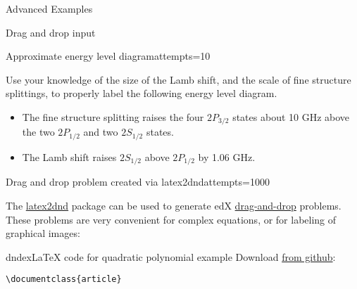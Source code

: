 
\begin{edXchapter}{Advanced Examples}

\begin{edXsection}{Drag and drop input}

\begin{edXvertical}

\begin{edXproblem}{Approximate energy level diagram}{attempts=10}

Use your knowledge of the size of the Lamb shift, and the scale of fine
structure splittings, to properly label the following energy level diagram.


\begin{edXsolution}

\begin{itemize}

\item The fine structure splitting raises the four $2P_{3/2}$ states about
10 GHz above the two $2P_{1/2}$ and two $2S_{1/2}$ states.

\item The Lamb shift raises $2S_{1/2}$ above $2P_{1/2}$ by 1.06 GHz.

\end{itemize}

\end{edXsolution}

\end{edXproblem}


\end{edXvertical}


\begin{edXvertical}

\begin{edXproblem}{Drag and drop problem created via latex2dnd}{attempts=1000}

The \href{https://github.com/mitocw/latex2dnd}{latex2dnd} package can
be used to generate edX
\href{http://edx.readthedocs.org/projects/devdata/en/latest/course_data_formats/drag_and_drop/drag_and_drop_input.html}{drag-and-drop}
problems.  These problems are very convenient for complex equations,
or for labeling of graphical images:

\begin{edXshowhide}{dndex}{LaTeX code for quadratic polynomial example}
Download \href{https://github.com/mitocw/latex2dnd/blob/master/latex2dnd/testtex/quadratic.tex}{from github}:
\begin{verbatim}
\documentclass{article}





\end{verbatim}
\end{edXshowhide}
\end{edXproblem}
\end{edXvertical}
\end{edXsection}
\end{edXchapter}

